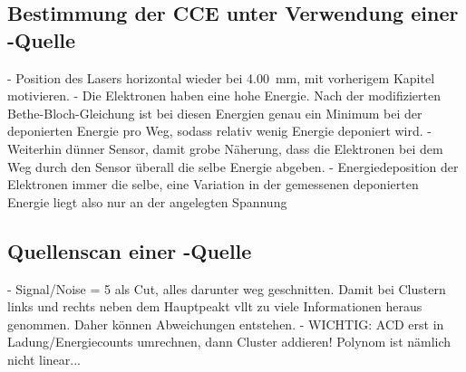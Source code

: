 \FloatBarrier
\subsection{Bestimmung der CCE unter Verwendung einer \texorpdfstring{}{Sr}-Quelle}
\label{sec:CCEQ-Auswertung}

- Position des Lasers horizontal wieder bei \SI{4.00}{\milli\meter}, mit vorherigem
Kapitel motivieren.
- Die Elektronen haben eine hohe Energie. Nach der modifizierten Bethe-Bloch-Gleichung
ist bei diesen Energien genau ein Minimum bei der deponierten Energie pro Weg, sodass
relativ wenig Energie deponiert wird.
- Weiterhin dünner Sensor, damit grobe Näherung, dass die Elektronen bei dem Weg durch
den Sensor überall die selbe Energie abgeben.
- Energiedeposition der Elektronen immer die selbe, eine Variation in der gemessenen
deponierten Energie liegt also nur an der angelegten Spannung

\FloatBarrier
\subsection{Quellenscan einer \texorpdfstring{}{Sr}-Quelle}
\label{sec:Quellenscan-Auswertung}

- Signal/Noise = 5 als Cut, alles darunter weg geschnitten. Damit bei Clustern
links und rechts neben dem Hauptpeakt vllt zu viele Informationen heraus genommen.
Daher können Abweichungen entstehen.
- WICHTIG: ACD erst in Ladung/Energiecounts umrechnen, dann Cluster addieren!
Polynom ist nämlich nicht linear...
